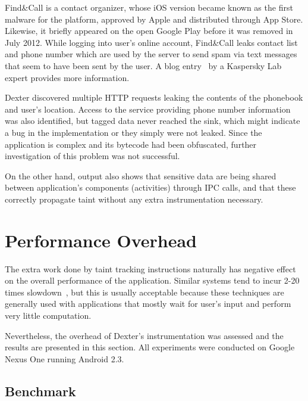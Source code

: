\documentclass[12pt,twoside,notitlepage]{report}
\begin{document}
Find\&Call is a contact organizer, whose iOS version became known as the first malware for the platform, approved by Apple and distributed through App Store. Likewise, it briefly appeared on the open Google Play before it was removed in July 2012. While logging into user's online account, Find\&Call leaks contact list and phone number which are used by the server to send spam via text messages that seem to have been sent by the user. A blog entry~\cite{report:FindAndCall} by a Kaspersky Lab expert provides more information.

Dexter discovered multiple HTTP requests leaking the contents of the phonebook and user's location. Access to the service providing phone number information was also identified, but tagged data never reached the sink, which might indicate a bug in the implementation or they simply were not leaked. Since the application is complex and its bytecode had been obfuscated, further investigation of this problem was not successful. 

On the other hand, output also shows that sensitive data are being shared between application's components (activities) through IPC calls, and that these correctly propagate taint without any extra instrumentation necessary.

\section{Performance Overhead}

The extra work done by taint tracking instructions naturally has negative effect on the overall performance of the application. Similar systems tend to incur 2-20 times slowdown~\cite{Yin:2007:PCS:1315245.1315261, Chow:2004:UDL:1251375.1251397}, but this is usually acceptable because these techniques are generally used with applications that mostly wait for user's input and perform very little computation. 

Nevertheless, the overhead of Dexter's instrumentation was assessed and the results are presented in this section. All experiments were conducted on Google Nexus One running Android 2.3. 

\subsection{Benchmark}
\end{document}

